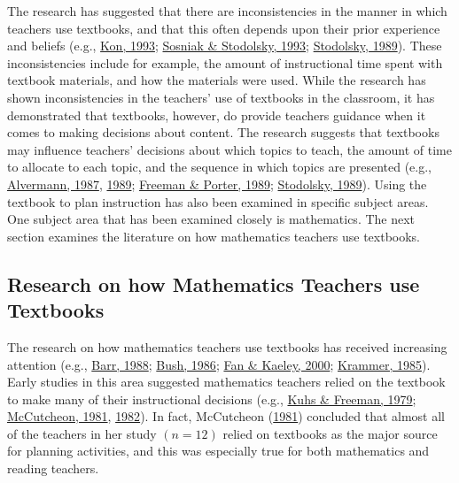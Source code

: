 \documentclass[11pt]{umnthesis}
\begin{document}
The research has suggested that there are inconsistencies in the manner in which teachers use textbooks, and that this often depends upon their prior experience and beliefs (e.g., \protect\hyperlink{ref-kon:1993}{Kon, 1993}; \protect\hyperlink{ref-sosniak:1993}{Sosniak \& Stodolsky, 1993}; \protect\hyperlink{ref-stodolsky:1989}{Stodolsky, 1989}). These inconsistencies include for example, the amount of instructional time spent with textbook materials, and how the materials were used. While the research has shown inconsistencies in the teachers' use of textbooks in the classroom, it has demonstrated that textbooks, however, do provide teachers guidance when it comes to making decisions about content. The research suggests that textbooks may influence teachers' decisions about which topics to teach, the amount of time to allocate to each topic, and the sequence in which topics are presented (e.g., \protect\hyperlink{ref-alvermann:1987}{Alvermann, 1987}, \protect\hyperlink{ref-alvermann:1989}{1989}; \protect\hyperlink{ref-freeman:1989}{Freeman \& Porter, 1989}; \protect\hyperlink{ref-stodolsky:1989}{Stodolsky, 1989}). Using the textbook to plan instruction has also been examined in specific subject areas. One subject area that has been examined closely is mathematics. The next section examines the literature on how mathematics teachers use textbooks.

\hypertarget{research-on-how-mathematics-teachers-use-textbooks}{%
\subsection{Research on how Mathematics Teachers use Textbooks}\label{research-on-how-mathematics-teachers-use-textbooks}}

The research on how mathematics teachers use textbooks has received increasing attention (e.g., \protect\hyperlink{ref-barr:1988}{Barr, 1988}; \protect\hyperlink{ref-bush:1986}{Bush, 1986}; \protect\hyperlink{ref-fan:2000}{Fan \& Kaeley, 2000}; \protect\hyperlink{ref-krammer:1985}{Krammer, 1985}). Early studies in this area suggested mathematics teachers relied on the textbook to make many of their instructional decisions (e.g., \protect\hyperlink{ref-kuhs:1979}{Kuhs \& Freeman, 1979}; \protect\hyperlink{ref-mccutcheon:1981}{McCutcheon, 1981}, \protect\hyperlink{ref-mccutcheon:1982}{1982}). In fact, McCutcheon (\protect\hyperlink{ref-mccutcheon:1981}{1981}) concluded that almost all of the teachers in her study \((n=12)\) relied on textbooks as the major source for planning activities, and this was especially true for both mathematics and reading teachers.
\end{document}
